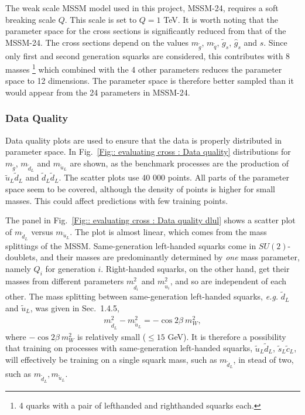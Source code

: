 \documentclass[twoside,english]{uiofysmaster}
\begin{document}
The weak scale MSSM model used in this project, MSSM-24, requires a soft breaking scale $Q$. This scale is set to $Q=1$ TeV. It is worth noting that the parameter space for the cross sections is significantly reduced from that of the MSSM-24. The cross sections depend on the values $m_{\tilde{g}}$, $m_{\tilde{q}}$, $\tilde{g}_s$, $\hat{g}_s$ and $s$. Since only first and second generation squarks are considered, this contributes with 8 masses \footnote{4 quarks with a pair of lefthanded and righthanded squarks each.} which combined with the 4 other parameters reduces the parameter space to 12 dimensions. The parameter space is therefore better sampled than it would appear from the 24 parameters in MSSM-24.

\subsubsection{Data Quality}




Data quality plots are used to ensure that the data is properly distributed in parameter space. In Fig.~\ref{Fig:: evaluating cross : Data quality} distributions for $m_{\tilde{g}}$, $m_{\tilde{d}_L}$ and $m_{\tilde{u}_L}$ are shown, as the benchmark processes are the production of $\tilde{u}_L \tilde{d}_L$ and $\tilde{d}_L \tilde{d}_L$. The scatter plots use 40 000 points. All parts of the parameter space seem to be covered, although the density of points is higher for small masses. This could affect predictions with few training points.

The panel in Fig.~\ref{Fig:: evaluating cross : Data quality dlul} shows a scatter plot of $m_{\tilde{d}_L}$ versus $m_{\tilde{u}_L}$. The plot is almost linear, which comes from the mass splittings of the MSSM. Same-generation left-handed squarks come in $SU(2)$-doublets, and their masses are predominantly determined by \textit{one} mass parameter, namely $Q_i$ for generation $i$. Right-handed squarks, on the other hand, get their masses from different parameters $m_{\tilde{d}_i}^2$ and $m_{\tilde{u}_i}^2$, and so are independent of each other. The mass splitting between same-generation left-handed squarks, \textit{e.g.} $\tilde{d}_L$ and $\tilde{u}_L$, was given in Sec.~1.4.5,
\begin{align*}
m_{\tilde{d}_L}^2 - m_{\tilde{u}_L}^2 = - \cos 2 \beta ~m_W^2,
\end{align*}
where $- \cos 2 \beta~m_W^2$ is relatively small ($\leq 15$ GeV). It is therefore a possibility that training on processes with same-generation left-handed squarks, $\tilde{u}_L \tilde{d}_L$, $\tilde{s}_L \tilde{c}_L$, will effectively be training on a single squark mass, such as $m_{\tilde{d}_L}$, in stead of two, such as $m_{\tilde{d}_L}, m_{\tilde{u}_L}$. 
\end{document}
